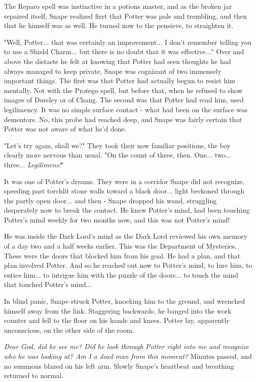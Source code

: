 The Reparo spell was instinctive in a potions master, and as the broken jar repaired itself, Snape realized first that Potter was pale and trembling, and then that he himself was as well. He turned now to the pensieve, to straighten it.

"Well, Potter... that was certainly an improvement... I don't remember telling you to use a Shield Charm... but there is no doubt that it was effective..." Over and above the distaste he felt at knowing that Potter had seen thoughts he had always managed to keep private, Snape was cognizant of two immensely important things. The first was that Potter had actually begun to resist him mentally. Not with the Protego spell, but before that, when he refused to show images of Dursley or of Chang. The second was that Potter had read him, used legilimency. It was no simple surface contact - what had been on the surface was dementors. No, this probe had reached deep, and Snape was fairly certain that Potter was not aware of what he'd done.

"Let's try again, shall we?" They took their now familiar positions, the boy clearly more nervous than usual. "On the count of three, then. One... two... three... \emph{Legilimens!}"

It was one of Potter's dreams. They were in a corridor Snape did not recognize, speeding past torchlit stone walls toward a black door... light beckoned through the partly open door... and then - Snape dropped his wand, struggling desperately now to break the contact. He knew Potter's mind, had been touching Potter's mind weekly for two months now, and this was not Potter's mind!

He was inside the Dark Lord's mind as the Dark Lord reviewed his own memory of a day two and a half weeks earlier. This was the Department of Mysteries. These were the doors that blocked him from his goal. He had a plan, and that plan involved Potter. And so he reached out now to Potter's mind, to lure him, to entice him... to intrigue him with the puzzle of the doors... to touch the mind that touched Potter's mind...

In blind panic, Snape struck Potter, knocking him to the ground, and wrenched himself away from the link. Staggering backwards, he banged into the work counter and fell to the floor on his hands and knees. Potter lay, apparently unconscious, on the other side of the room.

\emph{Dear God, did he see me? Did he look through Potter right into me and recognize who he was looking at? Am I a dead man from this moment?} Minutes passed, and no summons blazed on his left arm. Slowly Snape's heartbeat and breathing returned to normal.

